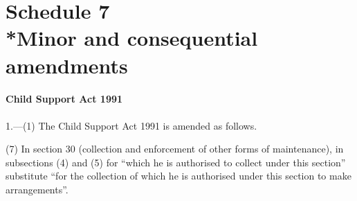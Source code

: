 \documentclass[a4paper]{article}
\newcommand{\parthead}{}
\begin{document}
%
%
%
%
%
%

\part[Schedule 7 --- Minor and consequential amendments]{Schedule 7\\*Minor and consequential amendments}

\renewcommand\parthead{--- Schedule 7}

\subsection*{Child Support Act 1991}

1.---(1) The Child Support Act 1991 is amended as follows.



(7) In section 30 (collection and enforcement of other forms of maintenance), in subsections (4) and (5) for “which he is authorised to collect under this section” substitute “for the collection of which he is authorised under this section to make arrangements”.
\end{document}
